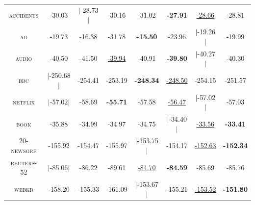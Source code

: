 \documentclass[14pt]{ffslides}
\newenvironment{vhcenterb}{\vspace*{\fill}\begin{center}}{\end{center}\vspace*{\fill}}
\begin{document}
\begin{vhcenterb}
{\begin{tabular}{c|ccccc|cc}
    \textsc{accidents } & -30.03 & $|$-28.73$|$ & -30.16 & -31.02 & \textbf{-27.91} & \underline{-28.66} & -28.81\\
    \textsc{ad        } & -19.73 & \underline{-16.38} & -31.78 & \textbf{-15.50} & -23.96 & $|$-19.26$|$ & -19.99\\
    \textsc{audio     } & -40.50 & -41.50 & \underline{-39.94} & -40.91 & \textbf{-39.80} & $|$-40.27$|$ & -40.30\\
    \textsc{bbc       } & $|$-250.68$|$ & -254.41 & -253.19 & \textbf{-248.34} & \underline{-248.50} & -254.15 & -251.57\\
    \textsc{netflix   } & $|$-57.02$|$ & -58.69 & \textbf{-55.71} & -57.58 & \underline{-56.47} & $|$-57.02$|$ & -57.03\\
    \textsc{book      } & -35.88 & -34.99 & -34.97 & -34.75 & $|$-34.40$|$ & \underline{-33.56} & \textbf{-33.41}\\
    \textsc{20-newsgrp} & -155.92 & -154.47 & -155.97 & $|$-153.75$|$ & -154.17 & \underline{-152.63} & \textbf{-152.34}\\
    \textsc{reuters-52} & $|$-85.06$|$ & -86.22 & -89.61 & \underline{-84.70} & \textbf{-84.59} & -85.69 & -85.76\\
    \textsc{webkb     } & -158.20 & -155.33 & -161.09 & $|$-153.67$|$ & -155.21 & \underline{-153.52} & \textbf{-151.80}\\

\end{tabular}}
\end{vhcenterb}
\end{document}
